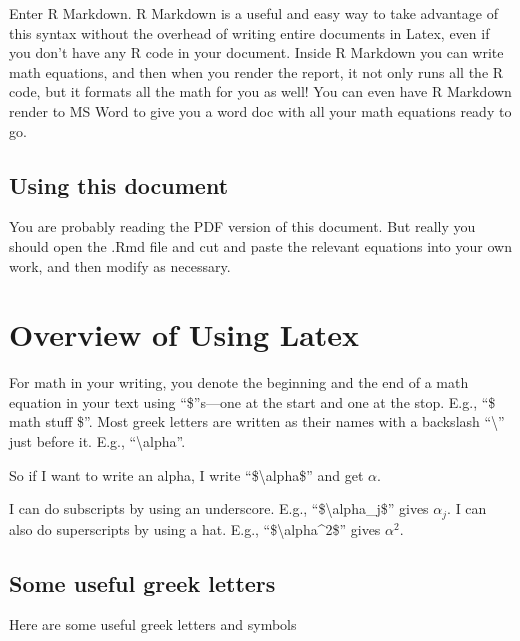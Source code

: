 \documentclass[
  letterpaper,
  DIV=11,
  numbers=noendperiod]{scrreprt}
\begin{document}
Enter R Markdown. R Markdown is a useful and easy way to take advantage
of this syntax without the overhead of writing entire documents in
Latex, even if you don't have any R code in your document. Inside R
Markdown you can write math equations, and then when you render the
report, it not only runs all the R code, but it formats all the math for
you as well! You can even have R Markdown render to MS Word to give you
a word doc with all your math equations ready to go.

\hypertarget{using-this-document}{%
\subsection{Using this document}\label{using-this-document}}

You are probably reading the PDF version of this document. But really
you should open the .Rmd file and cut and paste the relevant equations
into your own work, and then modify as necessary.

\hypertarget{overview-of-using-latex}{%
\section{Overview of Using Latex}\label{overview-of-using-latex}}

For math in your writing, you denote the beginning and the end of a math
equation in your text using ``\$''s---one at the start and one at the
stop. E.g., ``\$ math stuff \$''. Most greek letters are written as
their names with a backslash ``\textbackslash{}'' just before it. E.g.,
``\textbackslash alpha''.

So if I want to write an alpha, I write ``\$\textbackslash alpha\$'' and
get \(\alpha\).

I can do subscripts by using an underscore. E.g.,
``\$\textbackslash alpha\_j\$'' gives \(\alpha_j\). I can also do
superscripts by using a hat. E.g., ``\$\textbackslash alpha\^{}2\$''
gives \(\alpha^2\).

\newpage

\hypertarget{some-useful-greek-letters}{%
\subsection{Some useful greek letters}\label{some-useful-greek-letters}}

Here are some useful greek letters and symbols
\end{document}
